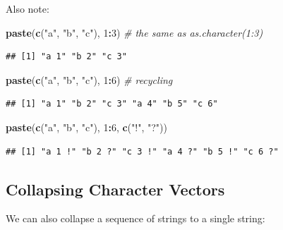 \documentclass[10pt,b5paper,krantz1]{krantz}
\newenvironment{Shaded}{\begin{snugshade}}{\end{snugshade}}
\newcommand{\CommentTok}[1]{\textcolor[rgb]{0.37,0.37,0.37}{\textit{#1}}}
\newcommand{\DecValTok}[1]{\textcolor[rgb]{0.06,0.06,0.06}{#1}}
\newcommand{\KeywordTok}[1]{\textcolor[rgb]{0.27,0.27,0.27}{\textbf{#1}}}
\newcommand{\NormalTok}[1]{#1}
\newcommand{\OperatorTok}[1]{\textcolor[rgb]{0.43,0.43,0.43}{\textbf{#1}}}
\newcommand{\StringTok}[1]{\textcolor[rgb]{0.5,0.5,0.5}{#1}}
\begin{document}
Also note:

\begin{Shaded}
\begin{Highlighting}[]
\KeywordTok{paste}\NormalTok{(}\KeywordTok{c}\NormalTok{(}\StringTok{"a"}\NormalTok{, }\StringTok{"b"}\NormalTok{, }\StringTok{"c"}\NormalTok{), }\DecValTok{1}\OperatorTok{:}\DecValTok{3}\NormalTok{) }\CommentTok{# the same as as.character(1:3)}
\end{Highlighting}
\end{Shaded}

\begin{verbatim}
## [1] "a 1" "b 2" "c 3"
\end{verbatim}

\begin{Shaded}
\begin{Highlighting}[]
\KeywordTok{paste}\NormalTok{(}\KeywordTok{c}\NormalTok{(}\StringTok{"a"}\NormalTok{, }\StringTok{"b"}\NormalTok{, }\StringTok{"c"}\NormalTok{), }\DecValTok{1}\OperatorTok{:}\DecValTok{6}\NormalTok{) }\CommentTok{# recycling}
\end{Highlighting}
\end{Shaded}

\begin{verbatim}
## [1] "a 1" "b 2" "c 3" "a 4" "b 5" "c 6"
\end{verbatim}

\begin{Shaded}
\begin{Highlighting}[]
\KeywordTok{paste}\NormalTok{(}\KeywordTok{c}\NormalTok{(}\StringTok{"a"}\NormalTok{, }\StringTok{"b"}\NormalTok{, }\StringTok{"c"}\NormalTok{), }\DecValTok{1}\OperatorTok{:}\DecValTok{6}\NormalTok{, }\KeywordTok{c}\NormalTok{(}\StringTok{"!"}\NormalTok{, }\StringTok{"?"}\NormalTok{))}
\end{Highlighting}
\end{Shaded}

\begin{verbatim}
## [1] "a 1 !" "b 2 ?" "c 3 !" "a 4 ?" "b 5 !" "c 6 ?"
\end{verbatim}

\hypertarget{collapsing-character-vectors}{%
\subsection{Collapsing Character Vectors}\label{collapsing-character-vectors}}

We can also collapse a sequence of strings to a single string:
\end{document}
